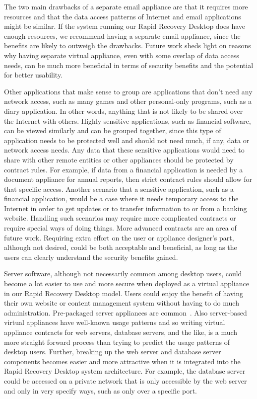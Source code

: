 The two main drawbacks of a separate email appliance are that it requires more resources and that the data access patterns of Internet and email applications might be similar. If the system running our Rapid Recovery Desktop does have enough resources, we recommend having a separate email appliance, since the benefits are likely to outweigh the drawbacks. Future work sheds light on reasons why having separate virtual appliance, even with some overlap of data access needs, can be much more beneficial in terms of security benefits and the potential for better usability.

Other applications that make sense to group are applications that don't need any network access, such as many games and other personal-only programs, such as a diary application. In other words, anything that is not likely to be shared over the Internet with others. Highly sensitive applications, such as financial software, can be viewed similarly and can be grouped together, since this type of application needs to be protected well and should not need much, if any, data or network access needs. Any data that these sensitive applications would need to share with other remote entities or other appliances should be protected by contract rules. For example, if data from a financial application is needed by a document appliance for annual reports, then strict contract rules should allow for that specific access. Another scenario that a sensitive application, such as a financial application, would be a case where it needs temporary access to the Internet in order to get updates or to transfer information to or from a banking website. Handling such scenarios may require more complicated contracts or require special ways of doing things. More advanced contracts are an area of future work. Requiring extra effort on the user or appliance designer's part, although not desired, could be both acceptable and beneficial, as long as the users can clearly understand the security benefits gained.

Server software, although not necessarily common among desktop users, could become a lot easier to use and more secure when deployed as a virtual appliance in our Rapid Recovery Desktop model. Users could enjoy the benefit of having their own website or content management system without having to do much administration. Pre-packaged server appliances are common~\cite{vmware_appliances_website, rPath_website, stacklet_website, virtual_appliances_website, jumpbox_website}. Also server-based virtual appliances have well-known usage patterns and so writing virtual appliance contracts for web servers, database servers, and the like, is a much more straight forward process than trying to predict the usage patterns of desktop users. Further, breaking up the web server and database server components becomes easier and more attractive when it is integrated into the Rapid Recovery Desktop system architecture. For example, the database server could be accessed on a private network that is only accessible by the web server and only in very specify ways, such as only over a specific port. 


